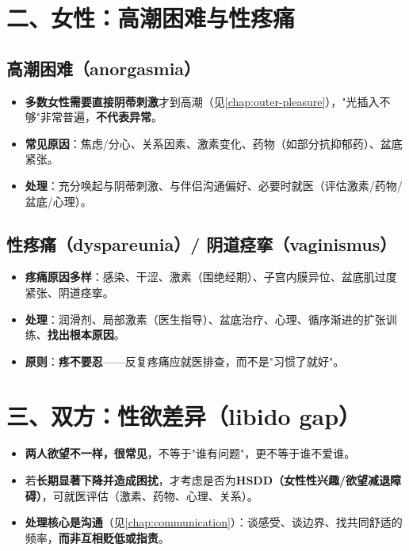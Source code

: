 \section{二、女性：高潮困难与性疼痛}

\subsection*{高潮困难（anorgasmia）}
\begin{itemize}[leftmargin=2em,itemsep=0.3em]
  \item \textbf{多数女性需要直接阴蒂刺激}才到高潮（见\ref{chap:outer-pleasure}），"光插入不够"非常普遍，\textbf{不代表异常}。
  \item \textbf{常见原因}：焦虑/分心、关系因素、激素变化、药物（如部分抗抑郁药）、盆底紧张。
  \item \textbf{处理}：充分唤起与阴蒂刺激、与伴侣沟通偏好、必要时就医（评估激素/药物/盆底/心理）。
\end{itemize}

\subsection*{性疼痛（dyspareunia）/ 阴道痉挛（vaginismus）}
\begin{itemize}[leftmargin=2em,itemsep=0.3em]
  \item \textbf{疼痛原因多样}：感染、干涩、激素（围绝经期）、子宫内膜异位、盆底肌过度紧张、阴道痉挛。
  \item \textbf{处理}：润滑剂、局部激素（医生指导）、盆底治疗、心理、循序渐进的扩张训练、\textbf{找出根本原因}。
  \item \textbf{原则}：\textbf{疼不要忍}——反复疼痛应就医排查，而不是"习惯了就好"。
\end{itemize}

\section{三、双方：性欲差异（libido gap）}

\begin{itemize}[leftmargin=2em,itemsep=0.3em]
  \item \textbf{两人欲望不一样，很常见}，不等于"谁有问题"，更不等于谁不爱谁。
  \item 若\textbf{长期显著下降并造成困扰}，才考虑是否为\textbf{HSDD（女性性兴趣/欲望减退障碍）}，可就医评估（激素、药物、心理、关系）。
  \item \textbf{处理核心是沟通}（见\ref{chap:communication}）：谈感受、谈边界、找共同舒适的频率，\textbf{而非互相贬低或指责}。
\end{itemize}

